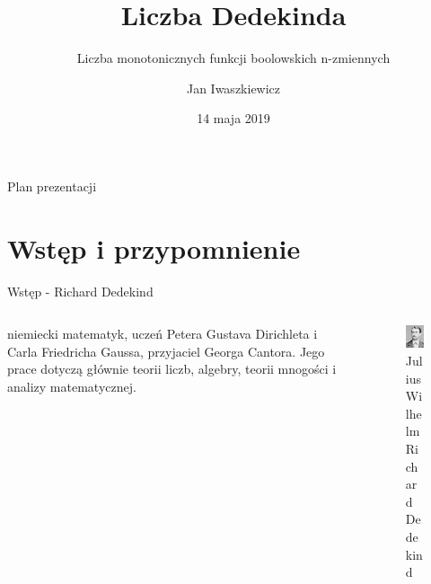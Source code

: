 \documentclass{if-beamer}
\title[Liczba Dedekinda]{Liczba Dedekinda}
\subtitle{Liczba monotonicznych funkcji boolowskich n-zmiennych}
\author{Jan Iwaszkiewicz}
\institute[MFI]{
  Wydział Matematyki, Fizyki i Informatyki\\
  Uniwersytet Gdański
}
\date{14 maja 2019}
\begin{document}
\begin{frame}
  \titlepage
\end{frame}

\usebackgroundtemplate{} 
\begin{frame}{Plan prezentacji}
  \tableofcontents
\end{frame}

\section{Wstęp i przypomnienie}
\begin{frame}{Wstęp - Richard Dedekind}

\begin{columns}

\begin{column}{0.6\textwidth}
\textbf{} niemiecki matematyk, uczeń Petera Gustava Dirichleta i Carla Friedricha Gaussa, przyjaciel Georga Cantora. Jego prace dotyczą głównie teorii liczb, algebry, teorii mnogości i analizy matematycznej.
\end{column}

\begin{column}{0.4\textwidth}

\begin{figure}
\centering
\includegraphics[scale=0.4]{richard.jpg}
\caption{Julius Wilhelm Richard Dedekind}
\end{figure}

\end{column}

\end{columns}
\end{frame}
\end{document}
